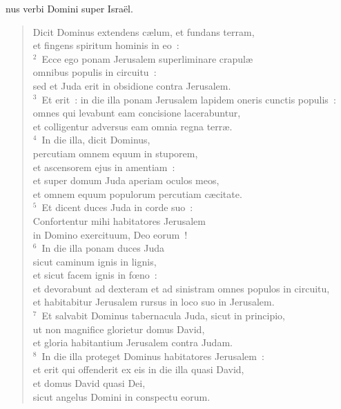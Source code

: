 \bchapter
{}nus verbi Domini super Isra\"el. \begin{verse}Dicit Dominus extendens c\ae lum, et fundans terram,\\ et fingens spiritum hominis in eo~:\\
${}^{2}$~Ecce ego ponam Jerusalem superliminare crapul\ae \\ omnibus populis in circuitu~:\\ sed et Juda erit in obsidione contra Jerusalem.\\
${}^{3}$~Et erit~: in die illa ponam Jerusalem lapidem oneris cunctis populis~:\\ omnes qui levabunt eam concisione lacerabuntur,\\ et colligentur adversus eam omnia regna terr\ae .\\
${}^{4}$~In die illa, dicit Dominus,\\ percutiam omnem equum in stuporem,\\ et ascensorem ejus in amentiam~:\\ et super domum Juda aperiam oculos meos,\\ et omnem equum populorum percutiam c\ae citate.\\
${}^{5}$~Et dicent duces Juda in corde suo~:\\ Confortentur mihi habitatores Jerusalem\\ in Domino exercituum, Deo eorum~!\\
${}^{6}$~In die illa ponam duces Juda\\ sicut caminum ignis in lignis,\\ et sicut facem ignis in fœno~:\\ et devorabunt ad dexteram et ad sinistram omnes populos in circuitu,\\ et habitabitur Jerusalem rursus in loco suo in Jerusalem.\\
${}^{7}$~Et salvabit Dominus tabernacula Juda, sicut in principio,\\ ut non magnifice glorietur domus David,\\ et gloria habitantium Jerusalem contra Judam.\\
${}^{8}$~In die illa proteget Dominus habitatores Jerusalem~:\\ et erit qui offenderit ex eis in die illa quasi David,\\ et domus David quasi Dei,\\ sicut angelus Domini in conspectu eorum.\end{verse}


